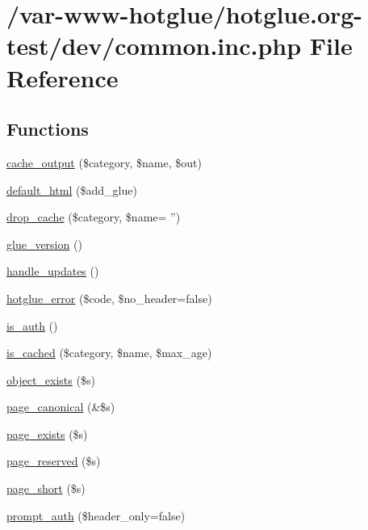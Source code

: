 \hypertarget{common_8inc_8php}{
\section{/var-\/www-\/hotglue/hotglue.org-\/test/dev/common.inc.php File Reference}
\label{common_8inc_8php}
}
\subsection*{Functions}
\begin{DoxyCompactItemize}
\item 
\hyperlink{common_8inc_8php_a6cceb5c6a3c421c18e925515c78f6dfd}{cache\_\-output} (\$category, \$name, \$out)
\item 
\hyperlink{common_8inc_8php_a8916cb6ec34ceeb3f48c86655c305974}{default\_\-html} (\$add\_\-glue)
\item 
\hyperlink{common_8inc_8php_a29be04ac495441a2d15a99fa6ef63e9d}{drop\_\-cache} (\$category, \$name= '')
\item 
\hyperlink{common_8inc_8php_a0d6d0da45f4adf6283bcccec9fd107e3}{glue\_\-version} ()
\item 
\hyperlink{common_8inc_8php_aa8712e8d1a52e2b8f00ecaf839205d24}{handle\_\-updates} ()
\item 
\hyperlink{common_8inc_8php_a7c4cb31a76aaf90f4399752ef35e00fe}{hotglue\_\-error} (\$code, \$no\_\-header=false)
\item 
\hyperlink{common_8inc_8php_ab3abbb2cd13e01231533e7cdc93da6db}{is\_\-auth} ()
\item 
\hyperlink{common_8inc_8php_a6fb34b9210b43349ca3eb16b2738a28b}{is\_\-cached} (\$category, \$name, \$max\_\-age)
\item 
\hyperlink{common_8inc_8php_a3d71a269e01b98748fb57719feef27be}{object\_\-exists} (\$s)
\item 
\hyperlink{common_8inc_8php_a31ed04b0c90ac3077e71743c307d45f8}{page\_\-canonical} (\&\$s)
\item 
\hyperlink{common_8inc_8php_aa71868111dd5b8af98df9cc9c968e523}{page\_\-exists} (\$s)
\item 
\hyperlink{common_8inc_8php_a75a714d369e1abc7ee1a15ca74c98124}{page\_\-reserved} (\$s)
\item 
\hyperlink{common_8inc_8php_ada968adfb989aa09adaf29867208f1ab}{page\_\-short} (\$s)
\item 
\hyperlink{common_8inc_8php_a80c23c9d8ac02159151d6368506b1b54}{prompt\_\-auth} (\$header\_\-only=false)

\end{DoxyCompactItemize}
